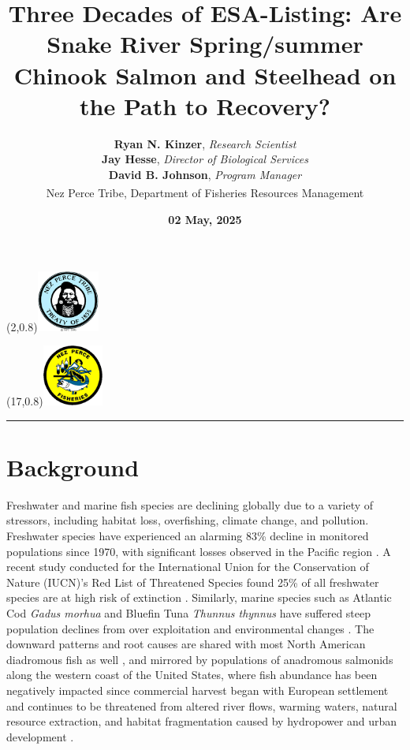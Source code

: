 \documentclass[12pt,a4paper]{article}
\title{Three Decades of ESA-Listing: Are Snake River Spring/summer Chinook Salmon and Steelhead on the Path to Recovery?}
\author{%
\textbf{Ryan N. Kinzer}, \emph{Research Scientist}\\[0.5em]
\textbf{Jay Hesse}, \emph{Director of Biological Services}\\[0.5em]
\textbf{David B. Johnson}, \emph{Program Manager}\\[0.5em]
\textsuperscript{} Nez Perce Tribe, Department of Fisheries Resources Management\\
}
\date{\textbf{02 May, 2025}}
\begin{document}

\maketitle

  \vspace*{-1.5cm}
  \begin{textblock}{4}(2,0.8)\includegraphics[height=2.0cm]{../templates/NPT.png}\end{textblock}
  \begin{textblock}{4}(17,0.8)\includegraphics[height=2.0cm]{../templates/DFRM.png}\end{textblock}


  \vspace{1em}
  \rule{\linewidth}{0.2pt}



\section{Background}\label{background}

Freshwater and marine fish species are declining globally due to a variety of stressors, including habitat loss, overfishing, climate change, and pollution. Freshwater species have experienced an alarming 83\% decline in monitored populations since 1970, with significant losses observed in the Pacific region \autocite{wwf_living_2022}. A recent study conducted for the International Union for the Conservation of Nature (IUCN)'s Red List of Threatened Species found 25\% of all freshwater species are at high risk of extinction \autocite{sayer_one-quarter_2025}. Similarly, marine species such as Atlantic Cod \emph{Gadus morhua} and Bluefin Tuna \emph{Thunnus thynnus} have suffered steep population declines from over exploitation and environmental changes \autocite{fao_state_2020}. The downward patterns and root causes are shared with most North American diadromous fish as well \autocite{waldman_north_2022}, and mirrored by populations of anadromous salmonids along the western coast of the United States, where fish abundance has been negatively impacted since commercial harvest began with European settlement \autocite{chapman_salmon_1986} and continues to be threatened from altered river flows, warming waters, natural resource extraction, and habitat fragmentation caused by hydropower and urban development \autocite{nehlsen_pacific_1991}.
\end{document}

